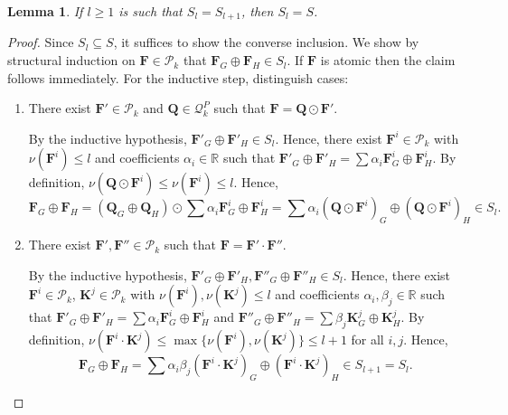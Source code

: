 \documentclass[a4paper,onecolumn,11pt,accepted=2026-01-06]{quantumarticle}
\theoremstyle{plain}
\newtheorem{lem}[thm]{Lemma}
\theoremstyle{remark}
\theoremstyle{definition}
\begin{document}
\begin{lem} \label{lem:chain-collapse}
	If $l \geq 1$ is such that $S_l = S_{l+1}$,
	then $S_l = S$.
\end{lem}
\begin{proof}
	Since $S_l \subseteq S$, it suffices to show the converse inclusion.
	We show by structural induction on $\boldsymbol{F} \in \mathcal{P}_k$ that $\boldsymbol{F}_G \oplus \boldsymbol{F}_H \in S_l$.
	If $\boldsymbol{F}$ is atomic then the claim follows immediately.
	For the inductive step, distinguish cases:
	\begin{enumerate}
		\item There exist $\boldsymbol{F}' \in \mathcal{P}_k$ and $\boldsymbol{Q} \in \mathcal{Q}_k^P$ such that $\boldsymbol{F} = \boldsymbol{Q} \odot \boldsymbol{F}'$.
		
		By the inductive hypothesis, $\boldsymbol{F}'_G \oplus \boldsymbol{F}'_H \in S_l$.
		Hence, there exist $\boldsymbol{F}^i \in \mathcal{P}_k$ with $\nu(\boldsymbol{F}^i) \leq l$ and coefficients $\alpha_i \in \mathbb{R}$ such that $\boldsymbol{F}'_G \oplus \boldsymbol{F}'_H  = \sum \alpha_i \boldsymbol{F}^i_G \oplus \boldsymbol{F}^i_H$.
		By definition, $\nu(\boldsymbol{Q} \odot \boldsymbol{F}^i) \leq \nu(\boldsymbol{F}^i) \leq l$.
		Hence,
		\[
			\boldsymbol{F}_G \oplus \boldsymbol{F}_H = (\boldsymbol{Q}_G \oplus \boldsymbol{Q}_H) \odot \sum \alpha_i \boldsymbol{F}^i_G \oplus \boldsymbol{F}^i_H
			= \sum \alpha_i (\boldsymbol{Q} \odot \boldsymbol{F}^i)_G
			 \oplus (\boldsymbol{Q} \odot \boldsymbol{F}^i)_H
			 \in S_l.
		\]
		
		\item There exist $\boldsymbol{F}', \boldsymbol{F}'' \in \mathcal{P}_k$ such that $\boldsymbol{F} = \boldsymbol{F}' \cdot \boldsymbol{F}''$.
		
		By the inductive hypothesis, $\boldsymbol{F}'_G \oplus \boldsymbol{F}'_H,\boldsymbol{F}''_G \oplus \boldsymbol{F}''_H  \in S_l$.
		Hence, there exist $\boldsymbol{F}^i \in \mathcal{P}_k$, $\boldsymbol{K}^j \in \mathcal{P}_k$ with $\nu(\boldsymbol{F}^i),\nu(\boldsymbol{K}^j) \leq l$ and coefficients $\alpha_i, \beta_j \in \mathbb{R}$ such that $\boldsymbol{F}'_G \oplus \boldsymbol{F}'_H  = \sum \alpha_i \boldsymbol{F}^i_G \oplus \boldsymbol{F}^i_H$
		and $\boldsymbol{F}''_G \oplus \boldsymbol{F}''_H  = \sum \beta_j \boldsymbol{K}^j_G \oplus \boldsymbol{K}^j_H$.
		By definition, $\nu(\boldsymbol{F}^i \cdot \boldsymbol{K}^j) \leq \max\{ \nu(\boldsymbol{F}^i), \nu(\boldsymbol{K}^j)\} \leq l+1$ for all $i, j$.
		Hence, 
		\[
			\boldsymbol{F}_G \oplus \boldsymbol{F}_H = \sum \alpha_i \beta_j (\boldsymbol{F}^i \cdot \boldsymbol{K}^j)_G \oplus 
			(\boldsymbol{F}^i \cdot \boldsymbol{K}^j)_H
			\in S_{l+1}  = S_l.
		\]
		

\end{enumerate}
\end{proof}
\end{document}
